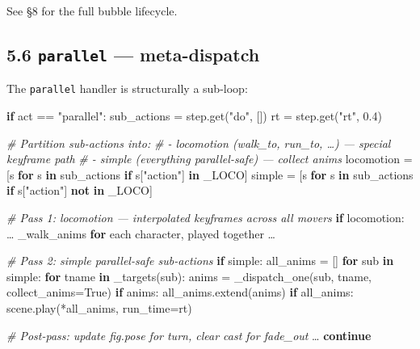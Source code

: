 \documentclass[
  11pt,
]{book}
\newenvironment{Shaded}{}{}
\newcommand{\CommentTok}[1]{\textcolor[rgb]{0.38,0.63,0.69}{\textit{#1}}}
\newcommand{\ControlFlowTok}[1]{\textcolor[rgb]{0.00,0.44,0.13}{\textbf{#1}}}
\newcommand{\FloatTok}[1]{\textcolor[rgb]{0.25,0.63,0.44}{#1}}
\newcommand{\KeywordTok}[1]{\textcolor[rgb]{0.00,0.44,0.13}{\textbf{#1}}}
\newcommand{\NormalTok}[1]{#1}
\newcommand{\OperatorTok}[1]{\textcolor[rgb]{0.40,0.40,0.40}{#1}}
\newcommand{\StringTok}[1]{\textcolor[rgb]{0.25,0.44,0.63}{#1}}
\newcommand{\VariableTok}[1]{\textcolor[rgb]{0.10,0.09,0.49}{#1}}
\begin{document}
See §8 for the full bubble lifecycle.

\subsection{\texorpdfstring{5.6 \texttt{parallel} ---
meta-dispatch}{5.6 parallel --- meta-dispatch}}\label{parallel-meta-dispatch}

The \texttt{parallel} handler is structurally a sub-loop:

\begin{Shaded}
\begin{Highlighting}[]
\ControlFlowTok{if}\NormalTok{ act }\OperatorTok{==} \StringTok{"parallel"}\NormalTok{:}
\NormalTok{    sub\_actions }\OperatorTok{=}\NormalTok{ step.get(}\StringTok{"do"}\NormalTok{, [])}
\NormalTok{    rt }\OperatorTok{=}\NormalTok{ step.get(}\StringTok{"rt"}\NormalTok{, }\FloatTok{0.4}\NormalTok{)}

    \CommentTok{\# Partition sub{-}actions into:}
    \CommentTok{\#  {-} locomotion (walk\_to, run\_to, …) — special keyframe path}
    \CommentTok{\#  {-} simple (everything parallel{-}safe) — collect anims}
\NormalTok{    locomotion }\OperatorTok{=}\NormalTok{ [s }\ControlFlowTok{for}\NormalTok{ s }\KeywordTok{in}\NormalTok{ sub\_actions }\ControlFlowTok{if}\NormalTok{ s[}\StringTok{"action"}\NormalTok{] }\KeywordTok{in}\NormalTok{ \_LOCO]}
\NormalTok{    simple     }\OperatorTok{=}\NormalTok{ [s }\ControlFlowTok{for}\NormalTok{ s }\KeywordTok{in}\NormalTok{ sub\_actions }\ControlFlowTok{if}\NormalTok{ s[}\StringTok{"action"}\NormalTok{] }\KeywordTok{not} \KeywordTok{in}\NormalTok{ \_LOCO]}

    \CommentTok{\# Pass 1: locomotion — interpolated keyframes across all movers}
    \ControlFlowTok{if}\NormalTok{ locomotion:}
\NormalTok{        … \_walk\_anims }\ControlFlowTok{for}\NormalTok{ each character, played together …}

    \CommentTok{\# Pass 2: simple parallel{-}safe sub{-}actions}
    \ControlFlowTok{if}\NormalTok{ simple:}
\NormalTok{        all\_anims }\OperatorTok{=}\NormalTok{ []}
        \ControlFlowTok{for}\NormalTok{ sub }\KeywordTok{in}\NormalTok{ simple:}
            \ControlFlowTok{for}\NormalTok{ tname }\KeywordTok{in}\NormalTok{ \_targets(sub):}
\NormalTok{                anims }\OperatorTok{=}\NormalTok{ \_dispatch\_one(sub, tname, collect\_anims}\OperatorTok{=}\VariableTok{True}\NormalTok{)}
                \ControlFlowTok{if}\NormalTok{ anims:}
\NormalTok{                    all\_anims.extend(anims)}
        \ControlFlowTok{if}\NormalTok{ all\_anims:}
\NormalTok{            scene.play(}\OperatorTok{*}\NormalTok{all\_anims, run\_time}\OperatorTok{=}\NormalTok{rt)}

    \CommentTok{\# Post{-}pass: update fig.pose for turn, clear cast for fade\_out}
\NormalTok{    …}
    \ControlFlowTok{continue}
\end{Highlighting}
\end{Shaded}
\end{document}
